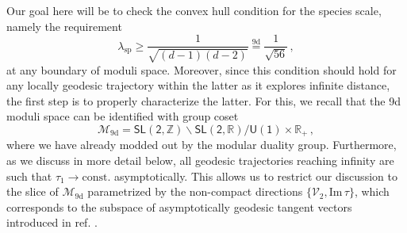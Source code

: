 Our goal here will be to check the convex hull condition for the species scale, namely the requirement
%
\begin{equation} \label{eq:bound9d}
  \lambda_{\text{sp}} \geq \frac{1}{\sqrt{(d-1)(d-2)}} \stackrel{\text{9d}}{=} \frac{1}{\sqrt{56}}\, ,
\end{equation}
%
at any boundary of moduli space. Moreover, since this condition should hold for any locally geodesic trajectory within the latter as it explores infinite distance, the first step is to properly characterize the latter. For this, we recall that the 9d moduli space can be identified with group coset
%
\begin{equation}\label{eq:9dmodspaceSSDC}
 \mathcal{M}_{\text{9d}}=\mathsf{SL(2, \mathbb{Z})}\backslash \mathsf{SL(2, \mathbb{R})}/\mathsf{U(1)} \times \mathbb{R}_+\, ,
\end{equation}
%
where we have already modded out by the modular duality group. Furthermore, as we discuss in more detail below, all geodesic trajectories reaching infinity are such that $\tau_1 \to \text{const.}$ asymptotically. This allows us to restrict our discussion to the slice of $\mathcal{M}_{\text{9d}}$ parametrized by the non-compact directions $\{ \mathcal{V}_2, \text{Im}\, \tau \}$, which corresponds to the subspace of asymptotically geodesic tangent vectors introduced in ref. \cite{Calderon-Infante:2020dhm}.

